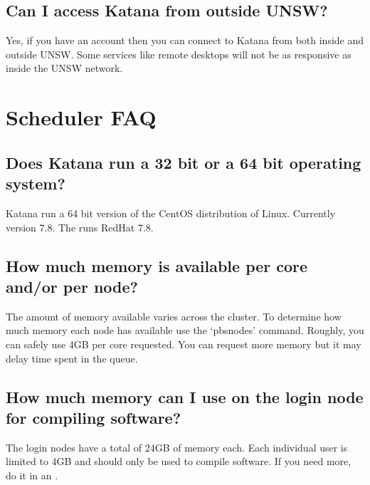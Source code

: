 \documentclass[letterpaper,10pt,english]{sphinxmanual}
\begin{document}
\subsection{Can I access Katana from outside UNSW?}
\label{\detokenize{faq:can-i-access-katana-from-outside-unsw}}
Yes, if you have an account then you can connect to Katana from both inside and outside UNSW. Some services \sphinxhyphen{} like remote desktops \sphinxhyphen{} will not be as responsive as inside the UNSW network.


\section{Scheduler FAQ}
\label{\detokenize{faq:scheduler-faq}}\label{\detokenize{faq:katana-compute-faq}}

\subsection{Does Katana run a 32 bit or a 64 bit operating system?}
\label{\detokenize{faq:does-katana-run-a-32-bit-or-a-64-bit-operating-system}}
Katana {\hyperref[\detokenize{glossary:term-Compute-Nodes}]{}} run a 64 bit version of the CentOS distribution of Linux. Currently version 7.8. The {\hyperref[\detokenize{glossary:term-Head-Node}]{}} runs RedHat 7.8.


\subsection{How much memory is available per core and/or per node?}
\label{\detokenize{faq:how-much-memory-is-available-per-core-and-or-per-node}}
The amount of memory available varies across the cluster. To determine how much memory each node has available use the ‘pbsnodes’ command. Roughly, you can safely use 4GB per core requested. You can request more memory but it may delay time spent in the queue.


\subsection{How much memory can I use on the login node for compiling software?}
\label{\detokenize{faq:how-much-memory-can-i-use-on-the-login-node-for-compiling-software}}
The login nodes have a total of 24GB of memory each. Each individual user is limited to 4GB and should only be used to compile software. If you need more, do it in an {\hyperref[\detokenize{glossary:term-Interactive-Job}]{}}.
\end{document}
